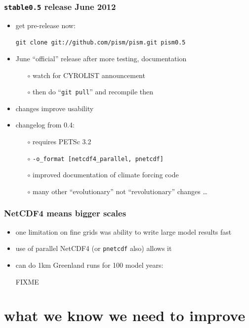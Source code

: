 \documentclass[hide notes,intlimits]{beamer}
\begin{document}
\begin{frame}
  \frametitle{\texttt{stable0.5} release June 2012}

  \begin{itemize}
  \item get pre-release now:
    \begin{center}
    \texttt{git clone git://github.com/pism/pism.git pism0.5}
    \end{center}
  \item June ``official'' release after more testing, documentation
    \begin{itemize}
    \item[$\circ$] watch for CYROLIST announcement
    \item[$\circ$] then do ``\texttt{git pull}'' and recompile then
    \end{itemize}
  \item changes improve usability\!
  \item changelog from 0.4:
    \begin{itemize}
    \item[$\circ$] requires PETSc 3.2
    \item[$\circ$] \texttt{-o\_format [netcdf4\_parallel, pnetcdf]}
    \item[$\circ$] improved documentation of climate forcing code
    \item[$\circ$] many other ``evolutionary'' not ``revolutionary'' changes \dots
    \end{itemize}
  \end{itemize}
\end{frame}


\begin{frame}
  \frametitle{NetCDF4 means bigger scales}

  \begin{itemize}
  \item one limitation on fine grids was ability to write large model results fast
  \item use of parallel NetCDF4 (or \texttt{pnetcdf} also) allows it
  \item can do 1km Greenland runs for 100 model years:
    \begin{center}
    FIXME %
    \end{center}
  \end{itemize}
\end{frame}


\section[to improve]{what we know we need to improve}
\end{document}
